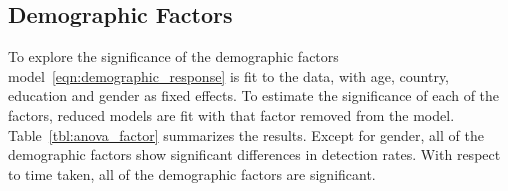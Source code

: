\documentclass[10pt]{article}\usepackage[]{graphicx}\usepackage[]{xcolor}
\begin{document}

\subsection{Demographic Factors} 

To explore the significance of the demographic factors model~\eqref{eqn:demographic_response} is fit to the data, with age, country, education and gender as fixed effects. To estimate the significance of each of the factors, reduced models are fit with that factor removed from the model. Table~\ref{tbl:anova_factor} summarizes the results. Except for gender, all of the demographic factors show significant differences in  detection rates.  With respect to time taken, all of the demographic factors are significant. 
\end{document}
